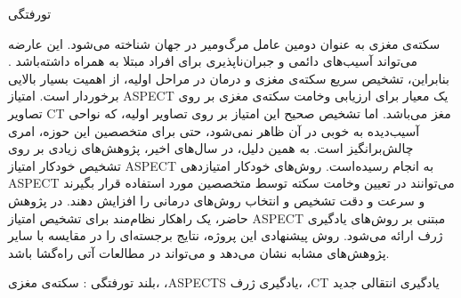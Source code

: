 


‌تورفتگی

سکته‌ی مغزی به عنوان دومین عامل مرگ‌و‌میر در جهان شناخته می‌شود.
این عارضه می‌تواند آسیب‌های دائمی و جبران‌ناپذیری برای افراد مبتلا به همراه داشته‌باشد \cite{donkor2018stroke}.
بنابراین،
تشخیص سریع سکته‌ی مغزی و درمان در مراحل اولیه، از اهمیت بسیار بالایی برخوردار است.
امتیاز ASPECT یک معیار برای ارزیابی وخامت سکته‌ی مغزی بر روی تصاویر CT مغز می‌باشد.
اما تشخیص صحیح این امتیاز بر روی تصاویر اولیه، که نواحی آسیب‌دیده به خوبی در آن ظاهر نمی‌شود، حتی برای متخصصین این حوزه، امری چالش‌بر‌انگیز است.
به همین دلیل، در سال‌های اخیر، پژوهش‌های زیادی بر روی تشخیص خودکار امتیاز ASPECT به انجام رسیده‌است.
روش‌های خودکار امتیاز‌دهی ASPECT می‌توانند
 در تعیین وخامت سکته توسط متخصصین مورد استفاده قرار بگیرند و سرعت و دقت تشخیص و انتخاب روش‌های درمانی را افزایش دهند.
 در پژوهش حاضر، 
 یک راهکار نظام‌مند برای تشخیص امتیاز ASPECT مبتنی بر روش‌های یادگیری ژرف ارائه می‌شود.
 روش پیشنهادی این پروژه،
 نتایج برجسته‌ای 
  را در مقایسه با سایر پژوهش‌های مشابه نشان می‌دهد و
می‌تواند در مطالعات آتی راه‌گشا باشد.

‌بلند
‌تورفتگی : 
سکته‌ی مغزی، ،ASPECTS یادگیری ژرف، ،CT یادگیری انتقالی
‌جدید
